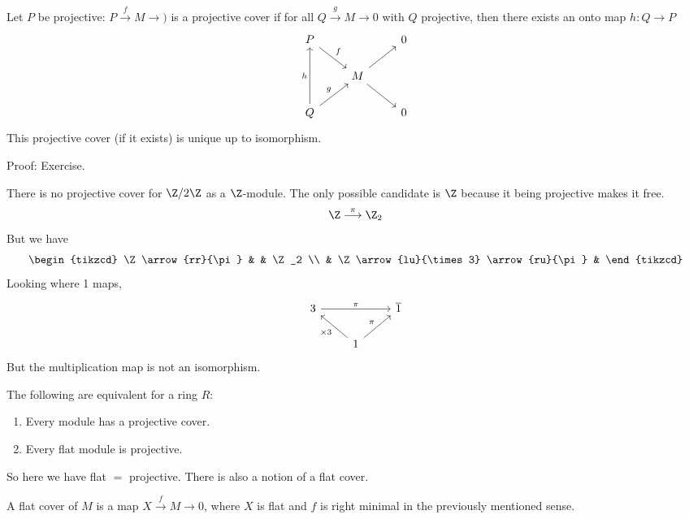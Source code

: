 \begin{prop}
Let $P$ be projective: $P \stackrel{f}{\rightarrow} M \rightarrow )$ is a projective cover if for all $Q \stackrel{g}{\rightarrow} M \rightarrow 0$ with $Q$ projective, then there exists an onto map $h: Q \rightarrow P$
\[
\begin{tikzcd}
P \arrow{dr}{f} & & 0 \\
& M \arrow{ru} \arrow{dr} & \\
Q \arrow{ru}{g} \arrow{uu}{h}  & & 0  
\end{tikzcd}
\]
This projective cover (if it exists) is unique up to isomorphism. 
\end{prop}

Proof: Exercise. \\

\begin{ex}
There is no projective cover for $\Z/2\Z$ as a $\Z$-module. The only possible candidate is $\Z$ because it being projective makes it free.
\[
\Z \stackrel{\pi}{\longrightarrow} \Z_2
\]
But we have
\[
\begin{tikzcd}
\Z \arrow{rr}{\pi} & & \Z_2 \\
& \Z \arrow{lu}{\times 3} \arrow{ru}{\pi} & 
\end{tikzcd}
\]
Looking where 1 maps, 
\[
\begin{tikzcd}
3 \arrow{rr}{\pi} & & \overline{1} \\
& 1 \arrow{lu}{\times 3} \arrow{ru}{\pi} & 
\end{tikzcd}
\]
But the multiplication map is not an isomorphism. 
\end{ex}

\begin{thm}
The following are equivalent for a ring $R$: 
\begin{enumerate}[(1)]
\item Every module has a projective cover.
\item Every flat module is projective. 
\end{enumerate}
\end{thm}

So here we have flat $=$ projective. There is also a notion of a flat cover. 

\begin{dfn}
A flat cover of $M$ is a map $X \stackrel{f}{\rightarrow} M \rightarrow 0$, where $X$ is flat and $f$ is right minimal in the previously mentioned sense. 
\end{dfn}

